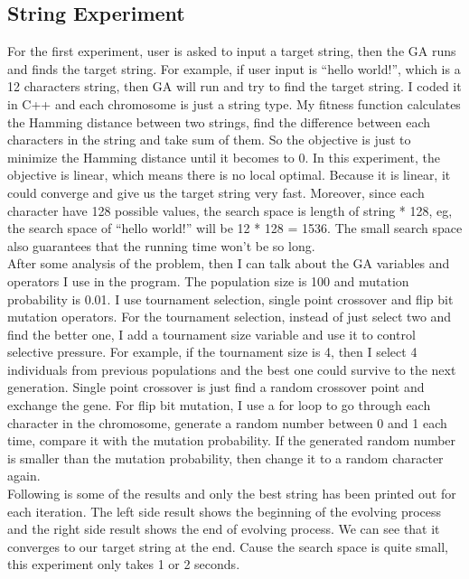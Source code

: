 \documentclass{article}
\begin{document}
\subsection{String Experiment}
For the first experiment, user is asked to input a target string, then the GA runs and finds the target string. For example, if user input is “hello world!”, which is a 12 characters string, then GA will run and try to find the target string. I coded it in C++ and each chromosome is just a string type. My fitness function calculates the Hamming distance between two strings, find the difference between each characters in the string and take sum of them. So the objective is just to minimize the Hamming distance until it becomes to 0. In this experiment, the objective is linear, which means there is no local optimal. Because it is linear, it could converge and give us the target string very fast. Moreover, since each character have 128 possible values, the search space is length of string * 128, eg, the search space of “hello world!” will be 12 * 128 = 1536. The small search space also guarantees that the running time won’t be so long. \\

After some analysis of the problem, then I can talk about the GA variables and operators I use in the program. The population size is 100 and mutation probability is 0.01. I use tournament selection, single point crossover and flip bit mutation operators. For the tournament selection, instead of just select two and find the better one, I add a tournament size variable and use it to control selective pressure. For example, if the tournament size is 4, then I select 4 individuals from previous populations and the best one could survive to the next generation. Single point crossover is just find a random crossover point and exchange the gene. For flip bit mutation, I use a for loop to go through each character in the chromosome, generate a random number between 0 and 1 each time, compare it with the mutation probability. If the generated random number is smaller than the mutation probability, then change it to a random character again. \\

Following is some of the results and only the best string has been printed out for each iteration. The left side result shows the beginning of the evolving process and the right side result shows the end of evolving process. We can see that it converges to our target string at the end. Cause the search space is quite small, this experiment only takes 1 or 2 seconds.
\end{document}
